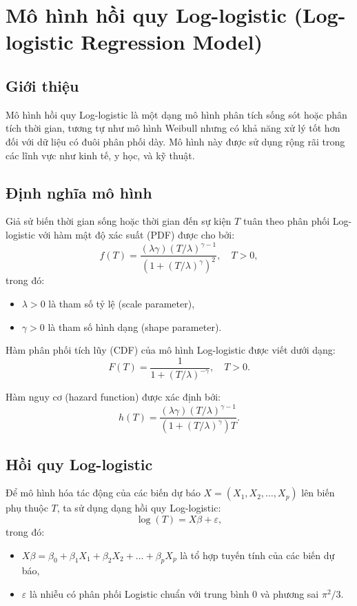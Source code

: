 \chapter{Mô hình hồi quy Log-logistic (Log-logistic Regression Model)}
\section{Giới thiệu}
Mô hình hồi quy Log-logistic là một dạng mô hình phân tích sống sót hoặc phân tích thời gian, tương tự như mô hình Weibull nhưng có khả năng xử lý tốt hơn đối với dữ liệu có đuôi phân phối dày. Mô hình này được sử dụng rộng rãi trong các lĩnh vực như kinh tế, y học, và kỹ thuật.

\section{Định nghĩa mô hình}
Giả sử biến thời gian sống hoặc thời gian đến sự kiện $T$ tuân theo phân phối Log-logistic với hàm mật độ xác suất (PDF) được cho bởi:
\begin{equation}
    f(T) = \frac{(\lambda \gamma) (T/\lambda)^{\gamma - 1}}{(1 + (T/\lambda)^\gamma)^2}, \quad T > 0,
\end{equation}
trong đó:
\begin{itemize}
    \item $\lambda > 0$ là tham số tỷ lệ (scale parameter),
    \item $\gamma > 0$ là tham số hình dạng (shape parameter).
\end{itemize}

Hàm phân phối tích lũy (CDF) của mô hình Log-logistic được viết dưới dạng:
\begin{equation}
    F(T) = \frac{1}{1 + (T/\lambda)^{-\gamma}}, \quad T > 0.
\end{equation}

Hàm nguy cơ (hazard function) được xác định bởi:
\begin{equation}
    h(T) = \frac{(\lambda \gamma) (T/\lambda)^{\gamma - 1}}{(1 + (T/\lambda)^\gamma) T}.
\end{equation}

\section{Hồi quy Log-logistic}
Để mô hình hóa tác động của các biến dự báo $X = (X_1, X_2, \dots, X_p)$ lên biến phụ thuộc $T$, ta sử dụng dạng hồi quy Log-logistic:
\begin{equation}
    \log(T) = X\beta + \varepsilon,
\end{equation}
trong đó:
\begin{itemize}
    \item $X\beta = \beta_0 + \beta_1 X_1 + \beta_2 X_2 + \dots + \beta_p X_p$ là tổ hợp tuyến tính của các biến dự báo,
    \item $\varepsilon$ là nhiễu có phân phối Logistic chuẩn với trung bình 0 và phương sai $\pi^2/3$.
\end{itemize}

